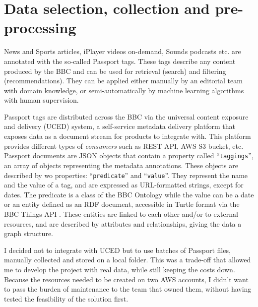 
\section{Data selection, collection and pre-processing}


News and Sports articles, iPlayer videos on-demand, Sounds podcasts etc. are annotated with the so-called Passport tags.
These tags describe any content produced by the BBC and can be used for retrieval (search) and filtering (recommendations).
They can be applied either manually by an editorial team with domain knowledge,
or semi-automatically by machine learning algorithms with human supervision.

Passport tags are distributed across the BBC via the universal content exposure and delivery (UCED) system,
a self-service metadata delivery platform that exposes data as a document stream for products to integrate with.
This platform provides different types of \textit{consumers} such as REST API, AWS S3 bucket, etc.
Passport documents are JSON objects that contain a property called ``\verb|taggings|'', an array of objects representing the
metadata annotations. These objects are described by wo properties: ``\verb|predicate|'' and ``\verb|value|''. They represent the name and the value of
a tag, and are expressed as URL-formatted strings, except for dates. The predicate is a class of the BBC Ontology \cite{BBC:Ontologies}
while the value can be a date or an entity defined as an RDF \cite{W3C:RDF,W3C:RDF:Concepts} document,
accessible in Turtle format \cite{W3C:Turtle} via the BBC Things API \cite{BBC:Things,BBC:Things:About,BBC:Things:API}.
These entities are linked to each other and/or to external resources, and are described by attributes and relationships, giving the
data a graph structure.


I decided not to integrate with UCED but to use batches of Passport files, manually collected and stored
on a local folder.
This was a trade-off that allowed me to develop the project with real data, while still keeping the costs down. Because the resources needed to
be created on two AWS accounts, I didn't want to pass the burden of maintenance to the team that owned them, without having tested
the feasibility of the solution first.

